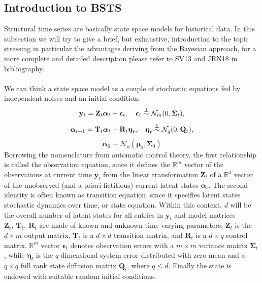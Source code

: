 \documentclass[11pt,twoside]{report}
\newcommand\independent{\protect\mathpalette{\protect\independenT}{\perp}}
\def\independenT#1#2{\mathrel{\rlap{$#1#2$}\mkern2mu{#1#2}}}
\begin{document}
\subsection{Introduction to BSTS}
Structural time series are basically state space models for historical data. In this subsection we will try to give a brief, but exhaustive, introduction to the topic stressing in particular the advantages deriving from the Bayesian approach, for a more complete and detailed description please refer to SV13 and JRN18 in bibliography.\\
\\
We can think a state space model as a couple of stochastic equations fed by independent noises and an initial condition:
\begin{equation}
\mathbf{y}_t = \mathbf{Z}_t \boldsymbol{\alpha}_t + \boldsymbol{\epsilon}_t,\quad \boldsymbol{\epsilon}_t \overset{\independent}{\sim} \mathcal{N}_m(0, \boldsymbol{\Sigma}_t),
\end{equation}
\begin{equation}
\boldsymbol{\alpha}_{t+1} = \mathbf{T}_t \boldsymbol{\alpha}_t + \mathbf{R}_t \boldsymbol{\eta}_t,\quad \boldsymbol{\eta}_t \overset{\independent}{\sim} \mathcal{N}_q(0, \mathbf{Q}_t),
\end{equation}
\begin{equation}
\boldsymbol{\alpha}_0 \sim \mathcal{N}_d(\boldsymbol{\mu}_0, \boldsymbol{\Sigma}_0)
\end{equation}
Borrowing the nomenclature from automatic control theory, the first relationship is called the observation equation, since it defines the $ \mathbb{R}^m$ vector of the observations at current time $ \mathbf{y}_t $ from the linear transformation $ \mathbf{Z}_t $ of a $ \mathbb{R}^d $ vector of the unobserved (and a priori fictitious) current latent states $ \boldsymbol{\alpha}_t $. The second identity is often known as transition equation, since it specifies latent states stochastic dynamics over time, or state equation. Within this context, $ d $ will be the overall number of latent states for all entries in $\mathbf{y}_t$ and model matrices $ \mathbf{Z}_t,\ \mathbf{T}_t,\ \mathbf{R}_t $ are made of known and unknown time varying parameters: $ \mathbf{Z}_t $ is the $ d \times m $ output matrix, $ \mathbf{T}_t $ is a $ d \times d $ transition matrix, and $ \mathbf{R}_t $ is a $ d \times q $ control matrix. $ \mathbb{R}^m $ vector $\boldsymbol{\epsilon}_t$ denotes observation errors with a $ m \times m $ variance matrix $ \boldsymbol{\Sigma}_t $, while $ \boldsymbol{\eta}_t $ is the $ q $-dimensional system error distributed with zero mean and a $ q \times q $ full rank state diffusion matrix $ \mathbf{Q}_t $, where $ q\leq d $. Finally the state is endowed with suitable random initial conditions.\\
\end{document}
